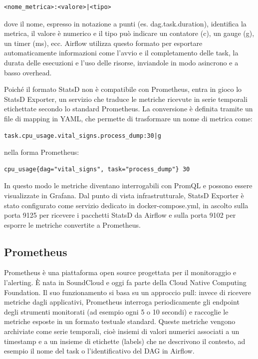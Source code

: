 \begin{verbatim}
<nome_metrica>:<valore>|<tipo>
\end{verbatim}

dove il nome, espresso in notazione a punti (es. dag.task.duration), identifica la metrica, il valore è numerico e il tipo può indicare un contatore (c), un gauge (g), un timer (ms), ecc. Airflow utilizza questo formato per esportare automaticamente informazioni come l’avvio e il completamento delle task, la durata delle esecuzioni e l’uso delle risorse, inviandole in modo asincrono e a basso overhead.

Poiché il formato StatsD non è compatibile con Prometheus, entra in gioco lo StatsD Exporter, un servizio che traduce le metriche ricevute in serie temporali etichettate secondo lo standard Prometheus. La conversione è definita tramite un file di mapping in YAML, che permette di trasformare un nome di metrica come:

\begin{verbatim}
task.cpu_usage.vital_signs.process_dump:30|g
\end{verbatim}

nella forma Prometheus:

\begin{verbatim}
cpu_usage{dag="vital_signs", task="process_dump"} 30
\end{verbatim}

In questo modo le metriche diventano interrogabili con PromQL e possono essere visualizzate in Grafana. Dal punto di vista infrastrutturale, StatsD Exporter è stato configurato come servizio dedicato in docker-compose.yml, in ascolto sulla porta 9125 per ricevere i pacchetti StatsD da Airflow e sulla porta 9102 per esporre le metriche convertite a Prometheus.

\subsection{Prometheus}
\label{sec:prometheus}
Prometheus è una piattaforma open source progettata per il monitoraggio e l’alerting. È nata in SoundCloud e oggi fa parte della Cloud Native Computing Foundation.
Il suo funzionamento si basa su un approccio pull: invece di ricevere metriche dagli applicativi, Prometheus interroga periodicamente gli endpoint degli strumenti monitorati (ad esempio ogni 5 o 10 secondi) e raccoglie le metriche esposte in un formato testuale standard.
Queste metriche vengono archiviate come serie temporali, cioè insiemi di valori numerici associati a un timestamp e a un insieme di etichette (labels) che ne descrivono il contesto, ad esempio il nome del task o l’identificativo del DAG in Airflow.

